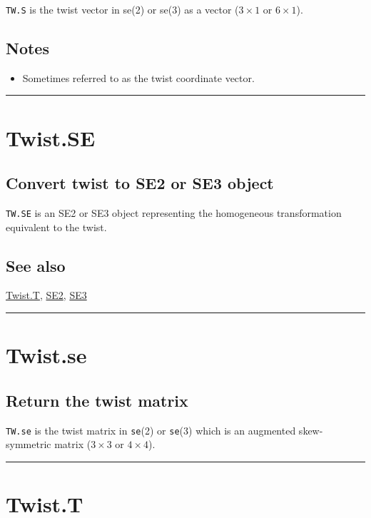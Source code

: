 \texttt{TW.S} is the twist vector in se(2) or se(3) as a vector ($3 \times 1$ or $6 \times 1$).


\subsection*{Notes}
\begin{itemize}
  \item Sometimes referred to as the twist coordinate vector.
\end{itemize}
\vspace{1.5ex}\hrule

\hypertarget{Twist.SE}{\section*{Twist.SE}}
\subsection*{Convert twist to SE2 or SE3 object}


\texttt{TW.SE} is an SE2 or SE3 object representing the homogeneous transformation equivalent to the twist.


\subsection*{See also}


\hyperlink{Twist.T}{\color{blue} Twist.T}, \hyperlink{SE2}{\color{blue} SE2}, \hyperlink{SE3}{\color{blue} SE3}

\vspace{1.5ex}\hrule

\hypertarget{Twist.se}{\section*{Twist.se}}
\subsection*{Return the twist matrix}


\texttt{TW.se} is the twist matrix in \texttt{se}(2) or \texttt{se}(3) which is an augmented
skew-symmetric matrix ($3 \times 3$ or $4 \times 4$).

\vspace{1.5ex}\hrule

\hypertarget{Twist.T}{\section*{Twist.T}}

